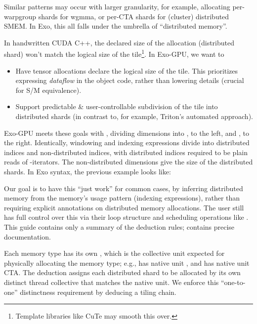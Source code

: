 \filbreak
Similar patterns may occur with larger granularity, for example, allocating per-warpgroup shards for wgmma, or per-CTA shards for (cluster) distributed SMEM.
In Exo, this all falls under the umbrella of ``distributed memory''.

\filbreak
In handwritten CUDA C++, the declared size of the allocation (distributed shard) won't match the logical size of the tile\footnote{Template libraries like CuTe may smooth this over.}. In Exo-GPU, we want to
\begin{itemize}
  \item Have tensor allocations declare the logical size of the tile. This prioritizes expressing \textit{dataflow} in the object code, rather than lowering details (crucial for S/M equivalence).
  \filbreak
  \item Support predictable \& user-controllable subdivision of the tile into distributed shards (in contrast to, for example, Triton's automated approach).
\end{itemize}

\filbreak
Exo-GPU meets these goals with , dividing dimensions into , to the left, and , to the right.
Identically, windowing and indexing expressions divide into distributed indices and non-distributed indices, with distributed indices required to be plain reads of -iterators.
The non-distributed dimensions give the size of the distributed shards.
In Exo syntax, the previous example looks like:

\filbreak


\filbreak
Our goal is to have this ``just work'' for common cases, by inferring distributed memory from the memory's usage pattern (indexing expressions), rather than requiring explicit annotations on distributed memory allocations.
The user still has full control over this via their loop structure and scheduling operations like .
This guide contains only a summary of the deduction rules;  contains precise documentation.

\filbreak
{} Each memory type has its own , which is the collective unit expected for physically allocating the memory type; e.g.,  has native unit , and  has native unit CTA.
The deduction assigns each distributed shard to be allocated by its own distinct thread collective that matches the native unit.
We enforce this ``one-to-one'' distinctness requirement by deducing a tiling chain.

